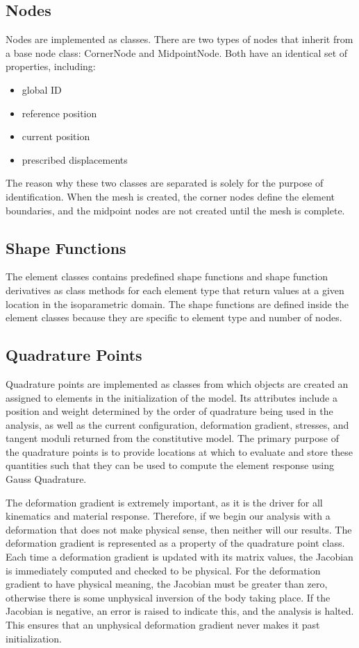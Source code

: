 \documentclass[]{spie}  %
\begin{document}
\subsection{Nodes}
Nodes are implemented as classes. There are two types of nodes that inherit from a base node class: CornerNode and MidpointNode. Both have an identical set of properties, including:
\begin{itemize}
	\item global ID
	\item reference position
	\item current position
	\item prescribed displacements
\end{itemize} 

The reason why these two classes are separated is solely for the purpose of identification. When the mesh is created, the corner nodes define the element boundaries, and the midpoint nodes are not created until the mesh is complete.

\subsection{Shape Functions}
The element classes contains predefined shape functions and shape function derivatives as class methods for each element type that return values at a given location in the isoparametric domain. The shape functions are defined inside the element classes because they are specific to element type and number of nodes.

\subsection{Quadrature Points}
Quadrature points are implemented as classes from which objects are created an assigned to elements in the initialization of the model. Its attributes include a position and weight determined by the order of quadrature being used in the analysis, as well as the current configuration, deformation gradient, stresses, and tangent moduli returned from the constitutive model. The primary purpose of the quadrature points is to provide locations at which to evaluate and store these quantities such that they can be used to compute the element response using Gauss Quadrature.

The deformation gradient is extremely important, as it is the driver for all kinematics and material response. Therefore, if we begin our analysis with a deformation that does not make physical sense, then neither will our results. The deformation gradient is represented as a property of the quadrature point class. Each time a deformation gradient is updated with its matrix values, the Jacobian is immediately computed and checked to be physical. For the deformation gradient to have physical meaning, the Jacobian must be greater than zero, otherwise there is some unphysical inversion of the body taking place. If the Jacobian is negative, an error is raised to indicate this, and the analysis is halted. This ensures that an unphysical deformation gradient never makes it past initialization. 
\end{document}
